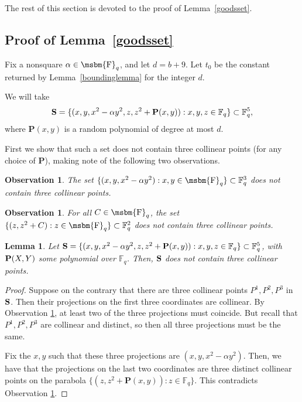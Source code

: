 \documentclass[12pt]{article}
\newtheorem{lemma}[theorem]{Lemma}
\newtheorem{observation}[theorem]{Observation}
\newcommand{\FF}{\mbox{\msbm{F}}}
\begin{document}
The rest of this section is devoted to the proof of Lemma~\ref{goodsset}. 

\subsection{Proof of Lemma~\ref{goodsset}}
Fix a nonsquare $\alpha\in \FF_q$, and let $d = b + 9$. Let $t_0$ be the constant returned by Lemma~\ref{boundinglemma} for the integer $d$.

We will take
$$\bold{S} = \{(x, y, x^2 - \alpha y^2, z, z^2 + \textbf{P}(x, y)): x,y,z\in \mathbb{F}_q\}\subset \mathbb{F}_q^5,$$
where $\textbf{P}(x,y)$ is a random polynomial of degree at most $d$.

First we show that such a set does not contain three collinear points (for any choice of $\textbf{P}$), making note of the following two observations. 
\begin{observation}\label{frontprojectionsnotcollinear}
    The set $\{(x, y, x^2 - \alpha y^2):x, y \in \FF_q\}\subset \mathbb{F}_q^3$ does not contain three collinear points. 
\end{observation}


\begin{observation}\label{backprojectionsnotcollinear}
    For all $C \in \FF_q$, the set $\{(z, z^2 + C) : z \in \FF_q\}\subset \mathbb{F}_q^2$ does not contain three collinear points. 
\end{observation}



\begin{lemma} \label{lem:no collinear triple}
Let $\bold{S} = \{(x, y, x^2 - \alpha y^2, z, z^2 + \bold{P}(x, y)): x,y,z\in \mathbb{F}_q\}\subset \mathbb{F}_q^5$, with $\bold{P}(X,Y)$ some polynomial over $\mathbb{F}_q$. Then, $\bold{S}$ does not contain three collinear points. 
\end{lemma}
\begin{proof}
    Suppose on the contrary that there are three collinear points $P^1, P^2, P^3$ in $\bold{S}$. Then their projections on the first three coordinates are collinear. By Observation \ref{frontprojectionsnotcollinear}, at least two of the three projections must coincide. But recall that $P^1, P^2, P^3$ are collinear and distinct, so then all three projections must be the same. 

    Fix the $x, y$ such that these three projections are $(x, y, x^2 - \alpha y^2)$. Then, we have that the projections on the last two coordinates are three distinct collinear points on the parabola $\{(z, z^2 + \textbf{P}(x, y)): z\in \mathbb{F}_q\}$. This contradicts Observation \ref{backprojectionsnotcollinear}. 
\end{proof}
\end{document}
